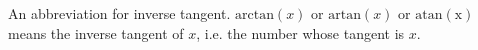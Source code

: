 An abbreviation for inverse tangent.
$\mathrm{arctan}(x)$ or $\mathrm{artan}(x)$ or $\mathrm{atan(x)}$ means the inverse tangent of $x$, i.e. the number whose tangent is $x$.